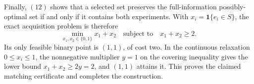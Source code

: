 Finally, \((12)\) shows that a selected set preserves the full-information
possibly-optimal set if and only if it contains both experiments.  With
\(x_i=\mathbf 1\{e_i\in S\}\), the exact acquisition problem is therefore
\[
\min_{x_1,x_2\in\{0,1\}}x_1+x_2
\quad\text{subject to}\quad x_1+x_2\geq2.
\tag{14}
\]
Its only feasible binary point is \((1,1)\), of cost two.  In the continuous
relaxation \(0\leq x_i\leq1\), the nonnegative multiplier \(y=1\) on the
covering inequality gives the lower bound
\(x_1+x_2\geq2y=2\), and \((1,1)\) attains it.  This proves the claimed
matching certificate and completes the construction.